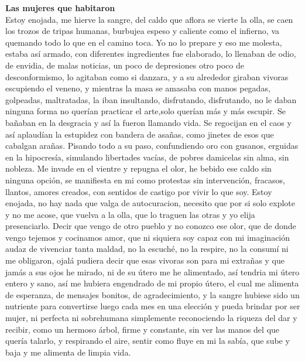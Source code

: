 \documentclass[12pt, a4paper, twoside]{book} %
\begin{document}
\noindent\textbf{Las mujeres que habitaron}\\
Estoy enojada, me hierve la sangre, del caldo que aflora se vierte la olla, se caen los trozos de tripas humanas, burbujea espeso y caliente como el infierno, va quemando todo lo que en el camino toca.
Yo no lo prepare y eso me molesta, estaba así armado, con diferentes ingredientes fue elaborado, lo llenaban de odio, de envidia, de malas noticias, un poco de depresiones otro poco de desconformismo, lo agitaban como si danzara, y a su alrededor giraban vivoras escupiendo el veneno, y mientras la masa se amasaba con manos pegadas, golpeadas, maltratadas, la iban insultando, disfrutando, disfrutando, no le daban ninguna forma no querían practicar el arte,solo querían más y más escupir.
Se bañaban en la desgracia y así la fueron llamando vida.
Se regocijan en el caos y así aplaudían la estupidez con bandera de asañas, como jinetes de esos que cabalgan arañas. Pisando todo a su paso, confundiendo oro con gusanos, erguidas en la hipocresía, simulando libertades vacías, de pobres damicelas sin alma, sin nobleza.
Me invade en el vientre y repugna el olor, he bebido ese caldo sin ninguna opción, se manifiesta en mi como protestas sin intervención, fracasos, llantos, amores creados, con sentidos de castigo por vivir lo que soy.
Estoy enojada, no hay nada que valga de autocuracion, necesito que por si solo explote y no me acose, que vuelva a la olla, que lo traguen las otras y yo elija presenciarlo.
Decir que vengo de otro pueblo y no conozco ese olor, que de donde vengo tejemos y cocinamos amor, que ni siquiera soy capaz con mi imaginación audaz de vivenciar tanta maldad, no la escuché, no la respire, no la consumí ni me obligaron, ojalá pudiera decir que esas vivoras son para mi extrañas y que jamás a sus ojos he mirado, ni de su útero me he alimentado, así tendria mi útero entero y sano, así me hubiera engendrado de mi propio útero, el cual me alimenta de esperanza, de mensajes bonitos, de agradecimiento, y la sangre hubiese sido un nutriente para convertirse luego cada mes en una elección y pueda brindar por ser mujer, ni perfecta ni sobrehumana simplemente reconociendo la riqueza del dar y recibir, como un hermoso árbol, firme y constante, sin ver las manos del que quería talarlo, y respirando el aire, sentir como fluye en mi la sabía, que sube y  baja y me alimenta de limpia vida.
\end{document}
